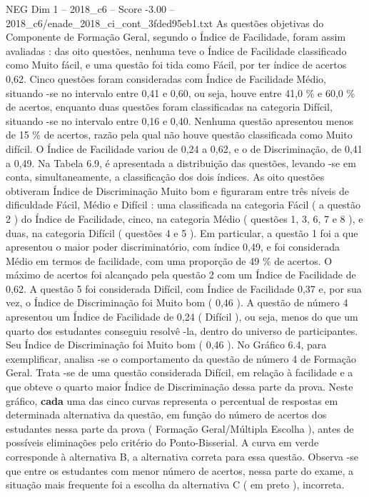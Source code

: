 \begin{textsample}{NEG Dim 1 – 2018\_c6 – Score -3.00 – 2018\_c6/enade\_2018\_ci\_cont\_3fded95eb1.txt}
As questões objetivas do Componente de Formação Geral, segundo o Índice de Facilidade, foram assim avaliadas : das oito questões, nenhuma teve o Índice de Facilidade classificado como Muito fácil, e uma questão foi tida como Fácil, por ter índice de acertos 0,62.
Cinco questões foram consideradas com Índice de Facilidade Médio, situando -se no intervalo entre 0,41 e 0,60, ou seja, houve entre 41,0 \% e 60,0 \% de acertos, enquanto duas questões foram classificadas na categoria Difícil, situando -se no intervalo entre 0,16 e 0,40.
Nenhuma questão apresentou menos de 15 \% de acertos, razão pela qual não houve questão classificada como Muito difícil.
O Índice de Facilidade variou de 0,24 a 0,62, e o de Discriminação, de 0,41 a 0,49.
Na Tabela 6.9, é apresentada a distribuição das questões, levando -se em conta, simultaneamente, a classificação dos dois índices.
As oito questões obtiveram Índice de Discriminação Muito bom e figuraram entre três níveis de dificuldade Fácil, Médio e Difícil : uma classificada na categoria Fácil ( a questão 2 ) do Índice de Facilidade, cinco, na categoria Médio ( questões 1, 3, 6, 7 e 8 ), e duas, na categoria Difícil ( questões 4 e 5 ).
Em particular, a questão 1 foi a que apresentou o maior poder discriminatório, com índice 0,49, e foi considerada Médio em termos de facilidade, com uma proporção de 49 \% de acertos.
O máximo de acertos foi alcançado pela questão 2 com um Índice de Facilidade de 0,62.
A questão 5 foi considerada Difícil, com Índice de Facilidade 0,37 e, por sua vez, o Índice de Discriminação foi Muito bom ( 0,46 ).
A questão de número 4 apresentou um Índice de Facilidade de 0,24 ( Difícil ), ou seja, menos do que um quarto dos estudantes conseguiu resolvê -la, dentro do universo de participantes.
Seu Índice de Discriminação foi Muito bom ( 0,46 ).
No Gráfico 6.4, para exemplificar, analisa -se o comportamento da questão de número 4 de Formação Geral.
Trata -se de uma questão considerada Difícil, em relação à facilidade e a que obteve o quarto maior Índice de Discriminação dessa parte da prova.
Neste gráfico, \textbf{cada} uma das cinco curvas representa o percentual de respostas em determinada alternativa da questão, em função do número de acertos dos estudantes nessa parte da prova ( Formação Geral/Múltipla Escolha ), antes de possíveis eliminações pelo critério do Ponto-Bisserial.
A curva em verde corresponde à alternativa B, a alternativa correta para essa questão.
Observa -se que entre os estudantes com menor número de acertos, nessa parte do exame, a situação mais frequente foi a escolha da alternativa C ( em preto ), incorreta.

\end{textsample}
